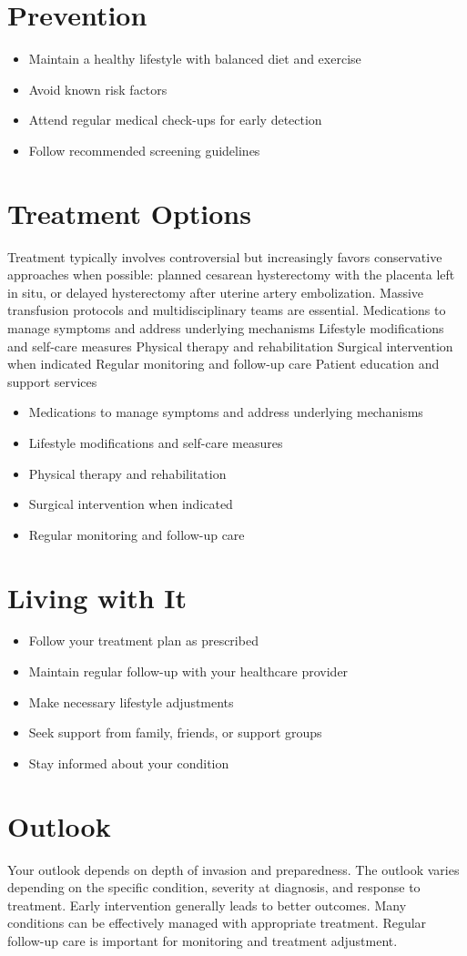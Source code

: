 \section{Prevention}
\begin{itemize}[noitemsep]
  \item Maintain a healthy lifestyle with balanced diet and exercise
  \item Avoid known risk factors
  \item Attend regular medical check-ups for early detection
  \item Follow recommended screening guidelines
\end{itemize}
\section{Treatment Options}
Treatment typically involves controversial but increasingly favors conservative approaches when possible: planned cesarean hysterectomy with the placenta left in situ, or delayed hysterectomy after uterine artery embolization. Massive transfusion protocols and multidisciplinary teams are essential. Medications to manage symptoms and address underlying mechanisms Lifestyle modifications and self-care measures Physical therapy and rehabilitation Surgical intervention when indicated Regular monitoring and follow-up care Patient education and support services

\begin{itemize}[noitemsep]
  \item Medications to manage symptoms and address underlying mechanisms
  \item Lifestyle modifications and self-care measures
  \item Physical therapy and rehabilitation
  \item Surgical intervention when indicated
  \item Regular monitoring and follow-up care
\end{itemize}
\section{Living with It}
\begin{itemize}[noitemsep]
  \item Follow your treatment plan as prescribed
  \item Maintain regular follow-up with your healthcare provider
  \item Make necessary lifestyle adjustments
  \item Seek support from family, friends, or support groups
  \item Stay informed about your condition
\end{itemize}
\section{Outlook}
Your outlook depends on depth of invasion and preparedness. The outlook varies depending on the specific condition, severity at diagnosis, and response to treatment. Early intervention generally leads to better outcomes. Many conditions can be effectively managed with appropriate treatment. Regular follow-up care is important for monitoring and treatment adjustment.
